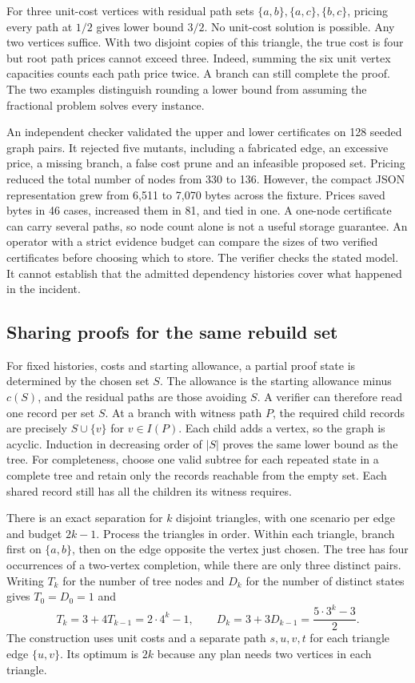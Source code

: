 \documentclass[11pt]{article}
\begin{document}
For three unit-cost vertices with residual path sets
$\{a,b\},\{a,c\},\{b,c\}$, pricing every path at $1/2$
gives lower bound $3/2$. No unit-cost solution is possible.
Any two vertices suffice. With two disjoint copies of this
triangle, the true cost is four but root path prices cannot
exceed three. Indeed, summing the six unit vertex capacities
counts each path price twice. A branch can still complete the
proof. The two examples distinguish rounding a lower bound
from assuming the fractional problem solves every instance.

An independent checker validated the upper and lower certificates
on 128 seeded graph pairs. It rejected five mutants, including
a fabricated edge, an excessive price, a missing branch, a
false cost prune and an infeasible proposed set. Pricing
reduced the total number of nodes from 330 to 136.
However, the compact JSON representation grew from 6,511 to
7,070 bytes across the fixture. Prices saved bytes in 46 cases,
increased them in 81, and tied in one. A one-node certificate
can carry several paths, so node count alone is not a useful
storage guarantee. An operator with a strict evidence budget
can compare the sizes of two verified certificates before
choosing which to store. The verifier checks the stated model.
It cannot establish that the admitted dependency histories
cover what happened in the incident.

\subsection{Sharing proofs for the same rebuild set}
For fixed histories, costs and starting allowance, a partial proof
state is determined by the chosen set $S$. The allowance is the
starting allowance minus $c(S)$, and the residual paths are those
avoiding $S$. A verifier can therefore read one record per set $S$.
At a branch with witness path $P$, the required child records are
precisely $S\cup\{v\}$ for $v\in I(P)$. Each child adds a vertex,
so the graph is acyclic. Induction in decreasing order of $|S|$
proves the same lower bound as the tree. For completeness, choose
one valid subtree for each repeated state in a complete tree and
retain only the records reachable from the empty set. Each shared
record still has all the children its witness requires.

There is an exact separation for $k$ disjoint triangles, with one
scenario per edge and budget $2k-1$. Process the triangles in order.
Within each triangle, branch first on $\{a,b\}$, then on the edge
opposite the vertex just chosen. The tree has four occurrences of
a two-vertex completion, while there are only three distinct pairs.
Writing $T_k$ for the number of tree nodes and $D_k$ for the number
of distinct states gives $T_0=D_0=1$ and
\[
T_k=3+4T_{k-1}=2\cdot 4^k-1,\qquad
D_k=3+3D_{k-1}=\frac{5\cdot 3^k-3}{2}.
\]
The construction uses unit costs and a separate path $s,u,v,t$
for each triangle edge $\{u,v\}$. Its optimum is $2k$ because
any plan needs two vertices in each triangle.
\end{document}
